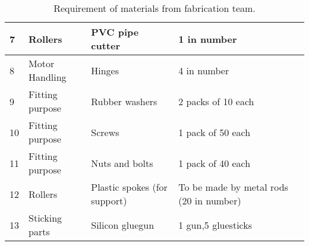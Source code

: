 \documentclass[table,french,english]{rapportCS}
\begin{document}
\begin{table}[h]
\begin{center}
{\begin{tabular}{|l|l|l|l|c|}
\hline
    7 & Rollers & PVC pipe cutter & 1 in number   \\
    \hline
    8 & Motor Handling & Hinges & 4 in number   \\
    \hline
    9 & Fitting purpose & Rubber washers & 2 packs of 10 each  \\
    \hline
    10 & Fitting purpose & Screws & 1 pack of 50 each  \\
    \hline
    11 & Fitting purpose & Nuts and bolts & 1 pack of 40 each  \\
    \hline
    12 & Rollers & Plastic spokes (for
support)
 & To be made by metal
rods (20 in number) \\
\hline
    13 & Sticking parts & Silicon gluegun & 1 gun,5 gluesticks   \\
    \hline
  \end{tabular}
  }
  \caption{Requirement of materials from fabrication team.}
\end{center}
  \label{tab:mytable}
\end{table}
\newpage
\end{document}
